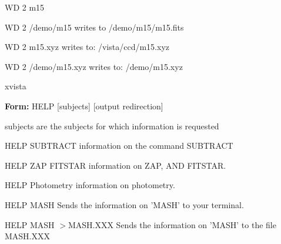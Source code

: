 {\newpage\clearpage
{}%
\begin{example}
   \item[WD 2 m15\hfill]{}
\end{example}%
\lthtmlfigureZ
\lthtmlcheckvsize\clearpage}

{\newpage\clearpage
{}%
\begin{example}
   \item[WD 2 /demo/m15\hfill]{writes to /demo/m15/m15.fits}
   \item[WD 2 m15.xyz\hfill]{writes to: /vista/ccd/m15.xyz}
   \item[WD 2 /demo/m15.xyz\hfill]{writes to: /demo/m15.xyz}
\end{example}%
\lthtmlfigureZ
\lthtmlcheckvsize\clearpage}

{\newpage\clearpage
{}%
\begin{example}
   \item[xvista\hfill]{}
\end{example}%
\lthtmlfigureZ
\lthtmlcheckvsize\clearpage}

{\newpage\clearpage
{}%
\begin{command}
   \item[\textbf{Form: } HELP {[subjects]} {[output redirection]}\hfill]{}
   \item[subjects]{are the subjects for which information is requested}
\end{command}%
\lthtmlfigureZ
\lthtmlcheckvsize\clearpage}

{\newpage\clearpage
{}%
\begin{example}
   \item[HELP SUBTRACT \hfill]{information on the command SUBTRACT}
   \item[HELP ZAP FITSTAR \hfill]{information on ZAP, AND FITSTAR.}
   \item[HELP Photometry \hfill]{information on photometry.}
\end{example}%
\lthtmlfigureZ
\lthtmlcheckvsize\clearpage}

{\newpage\clearpage
{}%
\begin{example}
   \item[HELP MASH\hfill]{Sends the information on 'MASH'
        to your terminal.}
   \item[HELP MASH $>$MASH.XXX\hfill]{Sends the information on 'MASH'
        to the file MASH.XXX}
\end{example}%
\lthtmlfigureZ
\lthtmlcheckvsize\clearpage}

